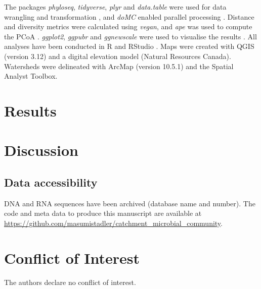 \documentclass[12pt,a4paper]{article} %
\begin{document}
The packages \textit{phyloseq}, \textit{tidyverse}, \textit{plyr} and \textit{data.table} were used for data wrangling and transformation \citep{McMurdie2013,Wickham2019, Wickham2011, Dowle2019}, and \textit{doMC} enabled parallel processing \citep{Analytics2019}. Distance and diversity metrics were calculated using \textit{vegan}, and \textit{ape} was used to compute the PCoA \citep{Oksanen2017, Paradis2018}. \textit{ggplot2}, \textit{ggpubr} and \textit{ggnewscale} were used to visualise the results \citep{Wickham2016, Kassambara2018, Campitelli2020}. All analyses have been conducted in R \citep{RCoreTeam2017} and RStudio \citep{RStudioTeam2016}. Maps were created with QGIS (version 3.12) and a digital elevation model (Natural Resources Canada). Watersheds were delineated with ArcMap (version 10.5.1) and the Spatial Analyst Toolbox. 

\section*{Results}

\section*{Discussion}

\subsection*{Data accessibility}
DNA and RNA sequences have been archived (database name and number). The code and meta data to produce this manuscript are available at \url{https://github.com/masumistadler/catchment_microbial_community}. \\

\section*{Conflict of Interest}
The authors declare no conflict of interest.
\end{document}
